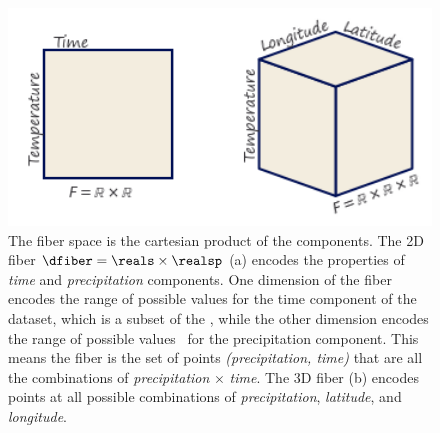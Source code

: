 \documentclass[../main.tex]{subfiles}
\begin{document}
\begin{figure}[H]
    \includegraphics[width=1\textwidth]{figures/math/fiber.png}
    \caption{The fiber space is the cartesian product of the components.  The 2D fiber \(\dfiber=\reals\times\realsp\) (a) encodes the properties of \textit{time} and \textit{precipitation} components.  One dimension of the fiber encodes the range of possible values for the time component of the dataset, which is a subset of the \reals, while the other dimension encodes the range of possible values  \realsp\ for the precipitation component. This means the fiber is the set of points \textit{(precipitation, time)} that are all the combinations of \textit{precipitation} $\times$ \textit{time}. The 3D fiber (b) encodes points at all possible combinations of \textit{precipitation}, \textit{latitude}, and \textit{longitude}.}
    \label{fig:math:data:fiber}
\end{figure}
\end{document}
